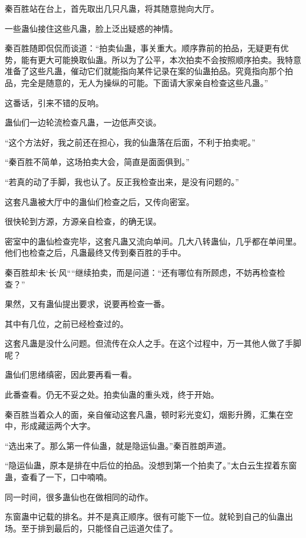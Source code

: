 
\begin{this_body}

秦百胜站在台上，首先取出几只凡蛊，将其随意抛向大厅。

一些蛊仙接住这些凡蛊，脸上泛出疑惑的神情。

秦百胜随即侃侃而谈道：“拍卖仙蛊，事关重大。顺序靠前的拍品，无疑更有优势，能有更大可能换取仙蛊。所以为了公平，本次拍卖不会按照顺序拍卖。我特意准备了这些凡蛊，催动它们就能指向某件记录在案的仙蛊拍品。究竟指向那个拍品，完全是随意的，无人为操纵的可能。下面请大家亲自检查这些凡蛊。”

这番话，引来不错的反响。

蛊仙们一边轮流检查凡蛊，一边低声交谈。

“这个方法好，我之前还在担心，我的仙蛊落在后面，不利于拍卖呢。”

“秦百胜不简单，这场拍卖大会，简直是面面俱到。”

“若真的动了手脚，我也认了。反正我检查出来，是没有问题的。”

这套凡蛊被大厅中的蛊仙们检查之后，又传向密室。

很快轮到方源，方源亲自检查，的确无误。

密室中的蛊仙检查完毕，这套凡蛊又流向单间。几大八转蛊仙，几乎都在单间里。他们也检查之后，凡蛊最终又传到秦百胜的手中。

秦百胜却未`长`风````继续拍卖，而是问道：“还有哪位有所顾虑，不妨再检查检查？”

果然，又有蛊仙提出要求，说要再检查一番。

其中有几位，之前已经检查过的。

这套凡蛊是没什么问题。但流传在众人之手。在这个过程中，万一其他人做了手脚呢？

蛊仙们思绪缜密，因此要再看一看。

此番查看。仍无不妥之处。拍卖仙蛊的重头戏，终于开始。

秦百胜当着众人的面，亲自催动这套凡蛊，顿时彩光变幻，烟影升腾，汇集在空中，形成藏运两个大字。

“选出来了。那么第一件仙蛊，就是隐运仙蛊。”秦百胜朗声道。

“隐运仙蛊，原本是排在中后位的拍品。没想到第一个拍卖了。”太白云生捏着东窗蛊，查看了一下，口中喃喃。

同一时间，很多蛊仙也在做相同的动作。

东窗蛊中记载的排名。并不是真正顺序。很有可能下一位。就轮到自己的仙蛊出场。至于排到最后的，只能怪自己运道欠佳了。


\end{this_body}
